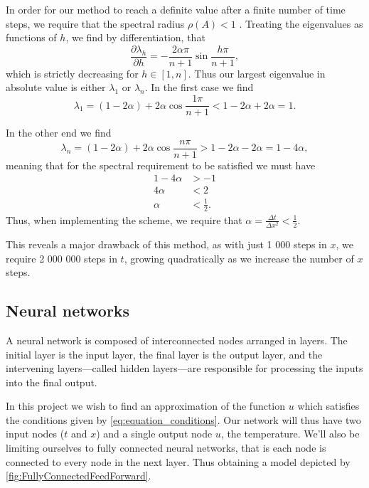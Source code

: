 \documentclass{article}
\theoremstyle{definition}
\begin{document}
In order for our method to reach a definite value after a finite number of time steps, we require that the spectral radius $\rho(A) < 1$ \parencite[p.~511]{matrixcomp}. Treating the eigenvalues as functions of $h$, we find by differentiation, that
\begin{equation*}
    \frac{\partial \lambda_h}{\partial h} = -\frac{2\alpha\pi}{n+1}\sin\frac{h\pi}{n+1},
\end{equation*}
which is strictly decreasing for $h \in [1, n]$. Thus our largest eigenvalue in absolute value is either $\lambda_1$ or $\lambda_n$. In the first case we find
\begin{equation*}
    \lambda_1 = (1 - 2\alpha) + 2\alpha \cos\frac{1\pi}{n + 1} < 1 - 2 \alpha + 2\alpha = 1.
\end{equation*}

In the other end we find
\begin{equation*}
    \lambda_n = (1 - 2\alpha) + 2\alpha \cos\frac{n\pi}{n + 1} > 1 - 2\alpha - 2\alpha = 1 - 4\alpha,
\end{equation*}
meaning that for the spectral requirement to be satisfied we must have
\begin{align*}
    1 - 4\alpha &> -1 \\
    4 \alpha &< 2 \\
    \alpha &< \frac{1}{2}.
\end{align*}
Thus, when implementing the scheme, we require that $\alpha=\frac{\Delta t}{\Delta x^2} < \frac{1}{2}$.

This reveals a major drawback of this method, as with just 1 000 steps in $x$, we require 2 000 000 steps in $t$, growing quadratically as we increase the number of $x$ steps.

\subsection{Neural networks}
A neural network is composed of interconnected nodes arranged in layers. The initial layer is the input layer, the final layer is the output layer, and the intervening layers—called hidden layers—are responsible for processing the inputs into the final output. 

In this project we wish to find an approximation of the function $u$ which satisfies the conditions given by \eqref{eq:equation_conditions}. Our network will thus have two input nodes ($t$ and $x$) and a single output node $u$, the temperature. We'll also be limiting ourselves to fully connected neural networks, that is each node is connected to every node in the next layer. Thus obtaining a model depicted by \autoref{fig:FullyConnectedFeedForward}.
\end{document}
